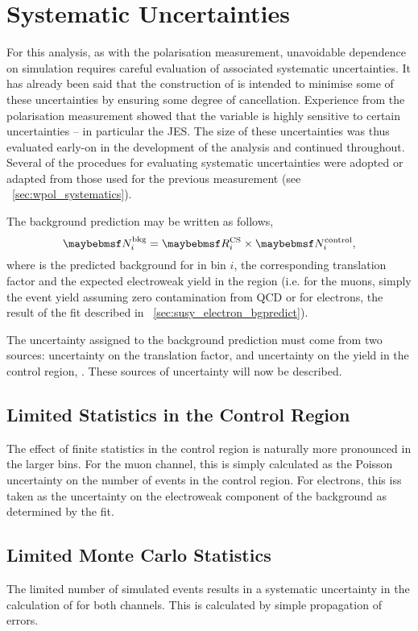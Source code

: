 \section{Systematic Uncertainties}
\label{sec:susy_systematics}
For this analysis, as with the \PW polarisation measurement, unavoidable
dependence on simulation requires careful evaluation of associated systematic
uncertainties. It has already been said that the construction of \RCS is
intended to minimise some of these uncertainties by ensuring some degree of
cancellation. Experience from the \PW polarisation measurement showed that the
\LP variable is highly sensitive to certain uncertainties -- in particular the
\ac{JES}. The size of these uncertainties was thus evaluated early-on in the
development of the analysis and continued throughout. Several of the procedues
for evaluating systematic uncertainties were adopted or adapted from those used
for the previous measurement (see \sec~\ref{sec:wpol_systematics}).

The background prediction may be written as follows,
\begin{equation*}
\NBkgi = \RCSi \times \NControli,
\end{equation*}
where \NBkgi is the predicted background for \LPsignal in \STlep bin $i$, \RCSi
the corresponding translation factor and \NControli the expected electroweak
yield in the region \LPcontrol (i.e. for the muons, simply the event yield
assuming zero contamination from \ac{QCD} or for electrons, the result of the
fit described in \sec~\ref{sec:susy_electron_bgpredict}).

The uncertainty assigned to the background prediction \NBkg must come from two
sources: uncertainty on the translation factor, \RCS and uncertainty on the yield
in the control region, \NControl. These sources of uncertainty will now be
described.

\subsection{Limited Statistics in the Control Region \texorpdfstring{\LPcontrol}{\LPcontrolBM}}
The effect of finite statistics in the control region is naturally more
pronounced in the larger \STlep bins. For the muon channel, this is simply
calculated as the Poisson uncertainty on the number of events in the control
region. For electrons, this iss taken as the uncertainty on the electroweak
component of the background as determined by the fit.

\subsection{Limited Monte Carlo Statistics}
\label{sec:susy_syst_mcstats}
The limited number of simulated events results in a systematic uncertainty in
the calculation of \RCS for both channels. This is calculated by simple
propagation of errors.

